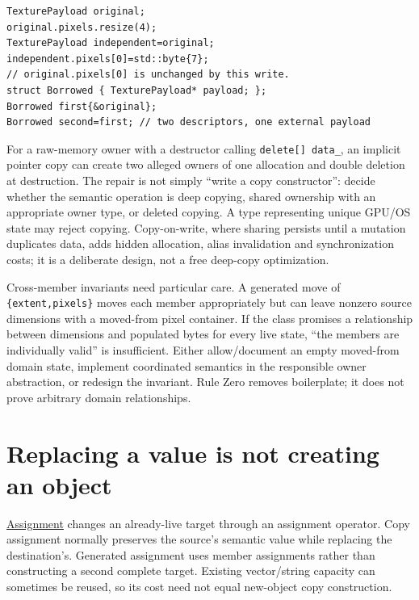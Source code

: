 \begin{verbatim}
TexturePayload original;
original.pixels.resize(4);
TexturePayload independent=original;
independent.pixels[0]=std::byte{7};
// original.pixels[0] is unchanged by this write.
struct Borrowed { TexturePayload* payload; };
Borrowed first{&original};
Borrowed second=first; // two descriptors, one external payload
\end{verbatim}

For a raw-memory owner with a destructor calling \texttt{delete{[}{]}\ data\_}, an implicit pointer copy can create two alleged owners of one allocation and double deletion at destruction. The repair is not simply ``write a copy constructor'': decide whether the semantic operation is deep copying, shared ownership with an appropriate owner type, or deleted copying. A type representing unique GPU/OS state may reject copying. Copy-on-write, where sharing persists until a mutation duplicates data, adds hidden allocation, alias invalidation and synchronization costs; it is a deliberate design, not a free deep-copy optimization.

Cross-member invariants need particular care. A generated move of \texttt{\{extent,pixels\}} moves each member appropriately but can leave nonzero source dimensions with a moved-from pixel container. If the class promises a relationship between dimensions and populated bytes for every live state, ``the members are individually valid'' is insufficient. Either allow/document an empty moved-from domain state, implement coordinated semantics in the responsible owner abstraction, or redesign the invariant. Rule Zero removes boilerplate; it does not prove arbitrary domain relationships.

\section{Replacing a value is not creating an object}\label{01-foundations-i-ch003-replacing-a-value-is-not-creating-an-object}

\hypertarget{01-foundations-i-ch003-replacing-a-value-is-not-creating-an-object}{}

\hyperref[appendix-bea6beb5350f]{Assignment} changes an already-live target through an assignment operator. Copy assignment normally preserves the source's semantic value while replacing the destination's. Generated assignment uses member assignments rather than constructing a second complete target. Existing vector/string capacity can sometimes be reused, so its cost need not equal new-object copy construction.

